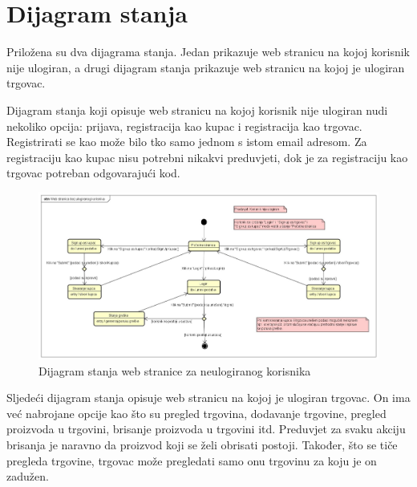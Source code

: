 		\section{Dijagram stanja}
			Priložena su dva dijagrama stanja. Jedan prikazuje web stranicu na kojoj korisnik nije ulogiran, a drugi dijagram stanja prikazuje web stranicu na kojoj je ulogiran trgovac.
			
			Dijagram stanja koji opisuje web stranicu na kojoj korisnik nije ulogiran nudi nekoliko opcija: prijava, registracija kao kupac i registracija kao trgovac. Registrirati se kao može bilo tko samo jednom s istom email adresom. Za registraciju kao kupac nisu potrebni nikakvi preduvjeti, dok je za registraciju kao trgovac potreban odgovarajući kod.
			
			
			
			\begin{figure}[H]
				\centering
				\includegraphics[width=1.0\linewidth]{dijagrami/web-neulogiran.jpg}
				\caption{Dijagram stanja web stranice za neulogiranog korisnika}
				\label{fig:state-web-neulogiran}
			\end{figure}
		
			Sljedeći dijagram stanja opisuje web stranicu na kojoj je ulogiran trgovac. On ima već nabrojane opcije kao što su pregled trgovina, dodavanje trgovine, pregled proizvoda u trgovini, brisanje proizvoda u trgovini itd. Preduvjet za svaku akciju brisanja je naravno da proizvod koji se želi obrisati postoji. Također, što se tiče pregleda trgovine, trgovac može pregledati samo onu trgovinu za koju je on zadužen.
		
